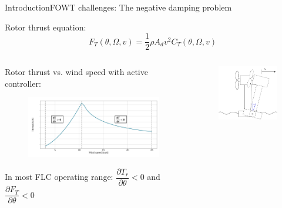\begin{frame}{Introduction}{FOWT challenges: The negative damping problem}
	
	Rotor thrust equation:
	\begin{equation} \label{eq:aero_thrust}
		F_T(\theta, \Omega, v) = \dfrac{1}{2} \rho A_d v^2 C_T(\theta, \Omega, v)
	\end{equation}
	
	\begin{columns}
		\begin{column}{.6\linewidth}
			Rotor thrust vs. wind speed with active controller:
			\begin{figure}[ht]
				\centering
				\includegraphics[width=1\linewidth]{../Graphics/ThrustWindpeedCurve.PNG}
				\label{fig:thrust_vs_windspeed}
			\end{figure}
			In most FLC operating range: $ \dfrac{\partial T_r}{\partial \theta} < 0 $ and $ \dfrac{\partial F_T}{\partial \theta} < 0 $ 
		\end{column}
		\begin{column}{.4\linewidth}
			\begin{figure}[ht]
				\centering
				\includegraphics[width=1\linewidth]{../Graphics/ForeAftMotionModel_onlyTurbine.pdf}

\end{figure}
\end{column}
\end{columns}
\end{frame}
